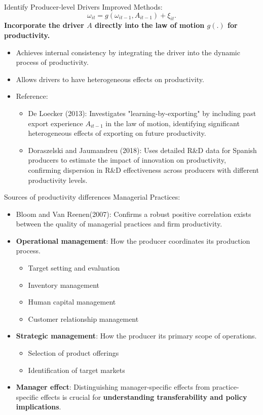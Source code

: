 \documentclass[aspectratio=169]{beamer}  %
\begin{document}
\begin{frame}{Identify Producer-level Drivers}
    Improved Methods:
    \[
    \omega_{it} = g(\omega_{it-1}, A_{it-1}) + \xi_{it}.
    \]
    \textbf{Incorporate the driver \(A\) directly into the law of motion \(g(.)\) for productivity.}
    \begin{itemize}
        \item Achieves internal consistency by integrating the driver into the dynamic process of productivity.
        \item Allows drivers to have heterogeneous effects on productivity.
        \item Reference:
        \begin{itemize}
            \item De Loecker (2013): Investigates "learning-by-exporting" by including past export experience \(A_{it-1}\) in the law of motion, identifying significant heterogeneous effects of exporting on future productivity.
            \item Doraszelski and Jaumandreu (2018): Uses detailed R\&D data for Spanish producers to estimate the impact of innovation on productivity, confirming dispersion in R\&D effectiveness across producers with different productivity levels.
        \end{itemize}
    \end{itemize}
\end{frame}


\begin{frame}{Sources of productivity differences}
    Managerial Practices:
    \begin{itemize}
        \item Bloom and Van Reenen(2007): Confirms a robust positive correlation exists between the quality of managerial practices and firm productivity.
        \item \textbf{Operational management}: How the producer coordinates its production process.
        \begin{itemize}
        \item Target setting and evaluation
        \item Inventory management
        \item Human capital management
        \item Customer relationship management
        \end{itemize}
        \item \textbf{Strategic management}: How the producer its primary scope of operations.
        \begin{itemize}
        \item Selection of product offerings
        \item Identification of target markets
        \end{itemize}
        \item \textbf{Manager effect}: Distinguishing manager-specific effects from practice-specific effects is crucial for \textbf{understanding transferability and policy implications}.
    \end{itemize}
\end{frame}
\end{document}
